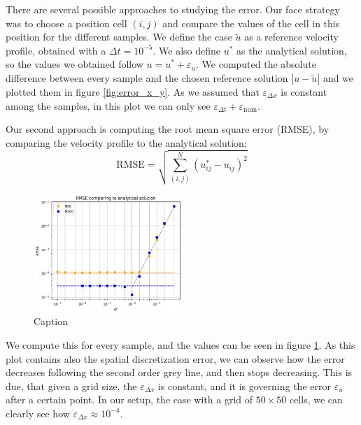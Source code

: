 There are several possible approaches to studying the error. Our face strategy was to choose a position cell $(i,j)$ and compare the values of the cell in this position for the different samples. We define the case $\tilde{u}$ as a reference velocity profile, obtained with a $\Delta t = 10^{-5}$. We also define $u^*$ as the analytical solution, so the values we obtained follow $u = u^* + \varepsilon_{u}$. We computed the absolute difference between every sample and the chosen reference solution $|u - \tilde{u}|$ and we plotted them in figure \ref{fig:error_x_y}. As we assumed that $\varepsilon_{\Delta x}$ is constant among the samples, in this plot we can only see $\varepsilon_{\Delta t} + \varepsilon_\text{num}$. 


Our second approach is computing the root mean square error (RMSE), by comparing the velocity profile to the analytical solution:
\begin{equation}
    \text{RMSE} = \sqrt{\sum_{(i,j)}^{N} (u^*_{ij} - u_{ij})^2 }
\end{equation}


\begin{figure}[!ht]
    \centering
    \includegraphics[width=0.5\textwidth]{resources/RMSE_study.PNG}
    \caption{Caption}
    \label{fig:RMSE}
\end{figure}

We compute this for every sample, and the values can be seen in figure \ref{fig:RMSE}. As this plot contains also the spatial discretization error, we can observe how the error decreases following the second order grey line, and then stops decreasing. This is due, that given a grid size, the $\varepsilon_{\Delta x}$ is constant, and it is governing the error $\varepsilon_u$ after a certain point. In our setup, the case with a grid of $50\times50$ cells, we can clearly see how $\varepsilon_{\Delta x} \approx 10^{-4}$.
